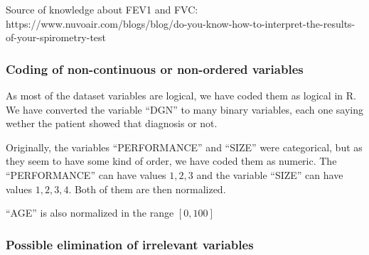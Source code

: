 Source of knowledge about FEV1 and FVC:
https://www.nuvoair.com/blogs/blog/do-you-know-how-to-interpret-the-results-of-your-spirometry-test






\subsubsection{Coding of non-continuous or non-ordered variables}

%
%
%

As most of the dataset variables are logical, we have coded them as logical in R. We have converted the variable ``DGN'' to many binary variables, each one saying wether the patient showed that diagnosis or not.

Originally, the variables ``PERFORMANCE'' and ``SIZE'' were categorical, but as they seem to have some kind of order, we have coded them as numeric. The ``PERFORMANCE'' can have values \(1,2,3\) and the variable ``SIZE'' can have values \(1,2,3,4\). Both of them are then normalized.

``AGE'' is also normalized in the range \([0, 100]\)

\subsubsection{Possible elimination of irrelevant variables}

